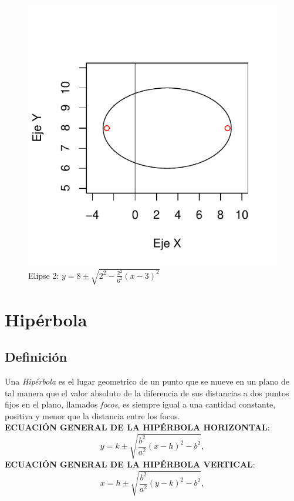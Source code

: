 \documentclass[12pt,a4paper]{article}
\begin{document}
\begin{figure}
\centering
\includegraphics[scale=.8]{ELI2}
\caption{Elipse 2: $ y = 8 \pm \sqrt{2^2 - \frac{2^2}{6^2}(x - 3)^2} $}
\label{fig:elipse2}
\end{figure}

\newpage
\section{Hipérbola} \label{sec:Hiperbola}
\subsection{Definici\'{o}n} \label{subsec:DefH}
Una \emph{Hipérbola} es el lugar geometrico de un punto que se mueve en un plano de tal manera que el valor absoluto de la diferencia de sus distancias a dos puntos fijos en el plano, llamados \emph{focos}, es siempre igual a una cantidad constante, positiva y menor que la distancia entre los focos.\cite{geometria}\\

\textbf{ECUACIÓN GENERAL DE LA HIPÉRBOLA HORIZONTAL}:
\begin{equation}
y = k \pm \sqrt{\frac{b^2}{a^2}(x - h)^2 - b^2}, \label{eq:hiperbolah}
\end{equation}
\textbf{ECUACIÓN GENERAL DE LA HIPÉRBOLA VERTICAL}:
\begin{equation}
x = h \pm \sqrt{\frac{b^2}{a^2}(y - k)^2 - b^2}, \label{eq:hiperobolav}
\end{equation}
\end{document}
